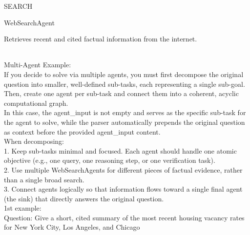 \begin{userprompt}[title={User Prompt}]


\quad{}SEARCH

\quad{}WebSearchAgent

\quad{}
Retrieves recent and cited factual information from the internet.

\quad{}

\qquad{}

\quad{}

\\

Multi-Agent Example: \\

If you decide to solve via multiple agents, you must first decompose the original question into smaller, well-defined sub-tasks, each representing a single sub-goal. Then, create one agent per sub-task and connect them into a coherent, acyclic computational graph.\\

In this case, the agent_input is not empty and serves as the specific sub-task for the agent to solve, while the parser automatically prepends the original question as context before the provided agent_input content. \\

When decomposing:\\

1. Keep sub-tasks minimal and focused. Each agent should handle one atomic objective (e.g., one query, one reasoning step, or one verification task). \\
2. Use multiple WebSearchAgents for different pieces of factual evidence, rather than a single broad search.\\
3. Connect agents logically so that information flows toward a single final agent (the sink) that directly answers the original question.\\


1st example:\\

Question: Give a short, cited summary of the most recent housing vacancy rates for New York City, Los Angeles, and Chicago\\




\end{userprompt}
